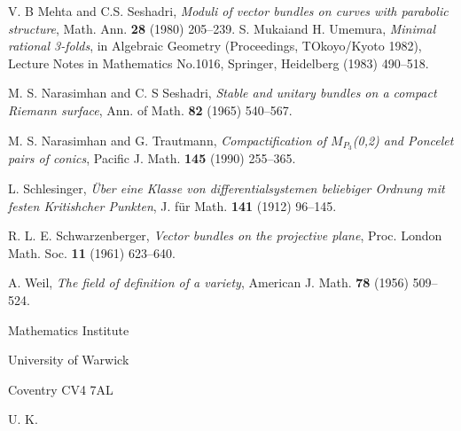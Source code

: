 \begin{thebibliography}{99}
 V. B Mehta and C.S. Seshadri, \textit{Moduli of vector bundles on curves with parabolic structure}, Math. Ann. {\bf 28} (1980) 205--239.
 S. Mukai\pageoriginale and H. Umemura, \textit{Minimal rational 3-folds}, in Algebraic Geometry (Proceedings, TOkoyo/Kyoto 1982), Lecture Notes in Mathematics No.1016, Springer, Heidelberg (1983) 490--518.

 M. S. Narasimhan and C. S Seshadri, \textit{Stable and unitary bundles on a compact Riemann surface}, Ann. of Math. {\bf 82} (1965) 540--567.

 M. S. Narasimhan and G. Trautmann, \textit{Compactification of $M_{P_{3}}$(0,2) and Poncelet pairs of conics}, Pacific J. Math. {\bf 145} (1990) 255--365.
 
 L. Schlesinger, \textit{\"Uber eine Klasse von differentialsystemen beliebiger Ordnung mit festen Kritishcher Punkten}, J. f\"ur Math. {\bf 141} (1912) 96--145.

 R. L. E. Schwarzenberger, \textit{Vector bundles on the projective plane}, Proc. London Math. Soc. {\bf 11} (1961) 623--640.

A. Weil, \textit{The field of definition of a variety}, American J. Math. {\bf 78} (1956) 509--524.
\end{thebibliography}

\bigskip

\begin{flushleft}
Mathematics Institute

University of Warwick

Coventry CV4 7AL

U. K.
\end{flushleft}
